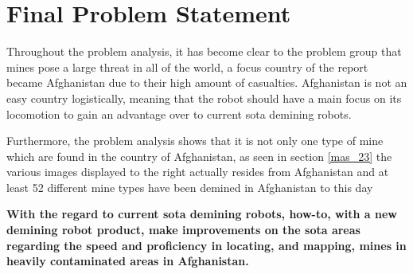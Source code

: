 \chapter{Final Problem Statement}

Throughout the problem analysis, it has become clear to the problem group that mines pose a large threat in all of the world, a focus country of the report became Afghanistan due to their high amount of casualties. Afghanistan is not an easy country logistically, meaning that the robot should have a main focus on its locomotion to gain an advantage over to current \gls{sota} demining robots. 

\vspace{2mm}

Furthermore, the problem analysis shows that it is not only one type of mine which are found in the country of Afghanistan, as seen in section \ref{mas_23} the various images displayed to the right actually resides from Afghanistan and at least 52 different mine types have been demined in Afghanistan to this day \cite{cat-uxo}

\vspace{4mm}

\textbf{With the regard to current \gls{sota} demining robots, how-to, with a new demining robot product, make improvements on the \gls{sota} areas regarding the speed and proficiency in locating, and mapping, mines in heavily contaminated areas in Afghanistan.}



